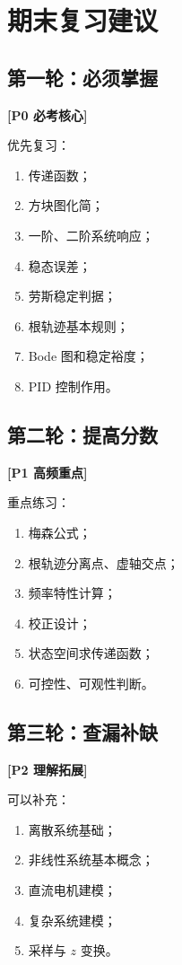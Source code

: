 \documentclass[UTF8,a4paper,12pt]{ctexart}
\newcommand{\Pzero}{\textcolor{p0}{\textbf{[P0 必考核心]}}}
\newcommand{\Pone}{\textcolor{p1}{\textbf{[P1 高频重点]}}}
\newcommand{\Ptwo}{\textcolor{p2}{\textbf{[P2 理解拓展]}}}
\begin{document}
\section{期末复习建议}

\subsection{第一轮：必须掌握}

\Pzero

优先复习：

\begin{enumerate}
    \item 传递函数；
    \item 方块图化简；
    \item 一阶、二阶系统响应；
    \item 稳态误差；
    \item 劳斯稳定判据；
    \item 根轨迹基本规则；
    \item Bode 图和稳定裕度；
    \item PID 控制作用。
\end{enumerate}

\subsection{第二轮：提高分数}

\Pone

重点练习：

\begin{enumerate}
    \item 梅森公式；
    \item 根轨迹分离点、虚轴交点；
    \item 频率特性计算；
    \item 校正设计；
    \item 状态空间求传递函数；
    \item 可控性、可观性判断。
\end{enumerate}

\subsection{第三轮：查漏补缺}

\Ptwo

可以补充：

\begin{enumerate}
    \item 离散系统基础；
    \item 非线性系统基本概念；
    \item 直流电机建模；
    \item 复杂系统建模；
    \item 采样与 $z$ 变换。
\end{enumerate}
\end{document}
